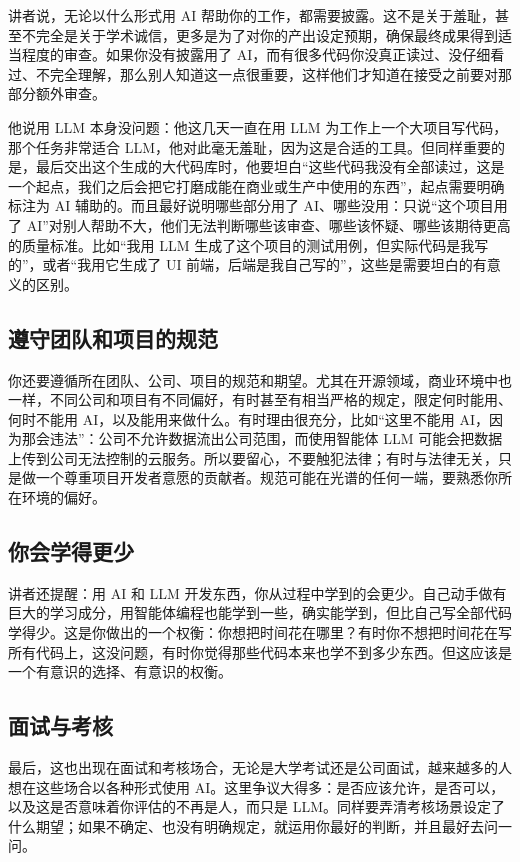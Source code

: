 \documentclass[a4paper]{article}
\begin{document}
讲者说，无论以什么形式用 AI 帮助你的工作，都需要披露。这不是关于羞耻，甚至不完全是关于学术诚信，更多是为了对你的产出设定预期，确保最终成果得到适当程度的审查。如果你没有披露用了 AI，而有很多代码你没真正读过、没仔细看过、不完全理解，那么别人知道这一点很重要，这样他们才知道在接受之前要对那部分额外审查。

他说用 LLM 本身没问题：他这几天一直在用 LLM 为工作上一个大项目写代码，那个任务非常适合 LLM，他对此毫无羞耻，因为这是合适的工具。但同样重要的是，最后交出这个生成的大代码库时，他要坦白“这些代码我没有全部读过，这是一个起点，我们之后会把它打磨成能在商业或生产中使用的东西”，起点需要明确标注为 AI 辅助的。而且最好说明哪些部分用了 AI、哪些没用：只说“这个项目用了 AI”对别人帮助不大，他们无法判断哪些该审查、哪些该怀疑、哪些该期待更高的质量标准。比如“我用 LLM 生成了这个项目的测试用例，但实际代码是我写的”，或者“我用它生成了 UI 前端，后端是我自己写的”，这些是需要坦白的有意义的区别。

\subsection{遵守团队和项目的规范}

你还要遵循所在团队、公司、项目的规范和期望。尤其在开源领域，商业环境中也一样，不同公司和项目有不同偏好，有时甚至有相当严格的规定，限定何时能用、何时不能用 AI，以及能用来做什么。有时理由很充分，比如“这里不能用 AI，因为那会违法”：公司不允许数据流出公司范围，而使用智能体 LLM 可能会把数据上传到公司无法控制的云服务。所以要留心，不要触犯法律；有时与法律无关，只是做一个尊重项目开发者意愿的贡献者。规范可能在光谱的任何一端，要熟悉你所在环境的偏好。

\subsection{你会学得更少}

讲者还提醒：用 AI 和 LLM 开发东西，你从过程中学到的会更少。自己动手做有巨大的学习成分，用智能体编程也能学到一些，确实能学到，但比自己写全部代码学得少。这是你做出的一个权衡：你想把时间花在哪里？有时你不想把时间花在写所有代码上，这没问题，有时你觉得那些代码本来也学不到多少东西。但这应该是一个有意识的选择、有意识的权衡。

\subsection{面试与考核}

最后，这也出现在面试和考核场合，无论是大学考试还是公司面试，越来越多的人想在这些场合以各种形式使用 AI。这里争议大得多：是否应该允许，是否可以，以及这是否意味着你评估的不再是人，而只是 LLM。同样要弄清考核场景设定了什么期望；如果不确定、也没有明确规定，就运用你最好的判断，并且最好去问一问。
\end{document}
